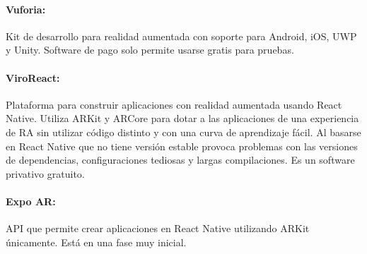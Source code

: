 \paragraph{Vuforia:}
Kit de desarrollo para realidad aumentada con soporte para Android, iOS, UWP y Unity.
Software de pago solo permite usarse gratis para pruebas.

\paragraph{ViroReact:}
Plataforma para construir aplicaciones con realidad aumentada usando React Native.
 Utiliza ARKit y ARCore para dotar a las aplicaciones de una experiencia de RA sin
 utilizar código distinto y con una curva de aprendizaje fácil. Al basarse en React
 Native que no tiene versión estable provoca problemas con las versiones de dependencias,
 configuraciones tediosas y largas compilaciones.
Es un software privativo gratuito.

\paragraph{Expo AR:}
API que permite crear aplicaciones en React Native utilizando ARKit únicamente.
Está en una fase muy inicial.

